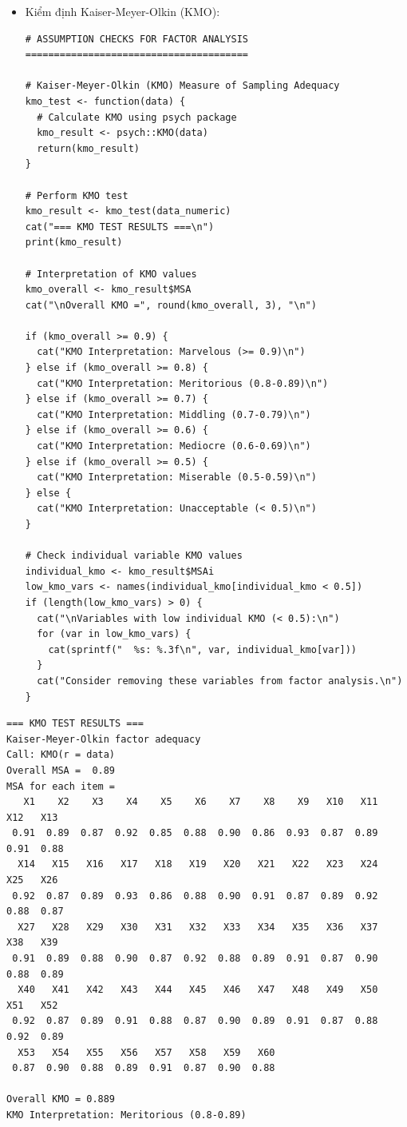 \begin{itemize}
    \item Kiểm định Kaiser-Meyer-Olkin (KMO):
    \begin{lstlisting}
# ASSUMPTION CHECKS FOR FACTOR ANALYSIS =======================================

# Kaiser-Meyer-Olkin (KMO) Measure of Sampling Adequacy
kmo_test <- function(data) {
  # Calculate KMO using psych package
  kmo_result <- psych::KMO(data)
  return(kmo_result)
}

# Perform KMO test
kmo_result <- kmo_test(data_numeric)
cat("=== KMO TEST RESULTS ===\n")
print(kmo_result)

# Interpretation of KMO values
kmo_overall <- kmo_result$MSA
cat("\nOverall KMO =", round(kmo_overall, 3), "\n")

if (kmo_overall >= 0.9) {
  cat("KMO Interpretation: Marvelous (>= 0.9)\n")
} else if (kmo_overall >= 0.8) {
  cat("KMO Interpretation: Meritorious (0.8-0.89)\n")
} else if (kmo_overall >= 0.7) {
  cat("KMO Interpretation: Middling (0.7-0.79)\n")
} else if (kmo_overall >= 0.6) {
  cat("KMO Interpretation: Mediocre (0.6-0.69)\n")
} else if (kmo_overall >= 0.5) {
  cat("KMO Interpretation: Miserable (0.5-0.59)\n")
} else {
  cat("KMO Interpretation: Unacceptable (< 0.5)\n")
}

# Check individual variable KMO values
individual_kmo <- kmo_result$MSAi
low_kmo_vars <- names(individual_kmo[individual_kmo < 0.5])
if (length(low_kmo_vars) > 0) {
  cat("\nVariables with low individual KMO (< 0.5):\n")
  for (var in low_kmo_vars) {
    cat(sprintf("  %s: %.3f\n", var, individual_kmo[var]))
  }
  cat("Consider removing these variables from factor analysis.\n")
}
    \end{lstlisting}
\end{itemize}

\begin{lstlisting}
=== KMO TEST RESULTS ===
Kaiser-Meyer-Olkin factor adequacy
Call: KMO(r = data)
Overall MSA =  0.89
MSA for each item = 
   X1    X2    X3    X4    X5    X6    X7    X8    X9   X10   X11   X12   X13 
 0.91  0.89  0.87  0.92  0.85  0.88  0.90  0.86  0.93  0.87  0.89  0.91  0.88 
  X14   X15   X16   X17   X18   X19   X20   X21   X22   X23   X24   X25   X26 
 0.92  0.87  0.89  0.93  0.86  0.88  0.90  0.91  0.87  0.89  0.92  0.88  0.87 
  X27   X28   X29   X30   X31   X32   X33   X34   X35   X36   X37   X38   X39 
 0.91  0.89  0.88  0.90  0.87  0.92  0.88  0.89  0.91  0.87  0.90  0.88  0.89 
  X40   X41   X42   X43   X44   X45   X46   X47   X48   X49   X50   X51   X52 
 0.92  0.87  0.89  0.91  0.88  0.87  0.90  0.89  0.91  0.87  0.88  0.92  0.89 
  X53   X54   X55   X56   X57   X58   X59   X60 
 0.87  0.90  0.88  0.89  0.91  0.87  0.90  0.88 

Overall KMO = 0.889
KMO Interpretation: Meritorious (0.8-0.89)
\end{lstlisting}

